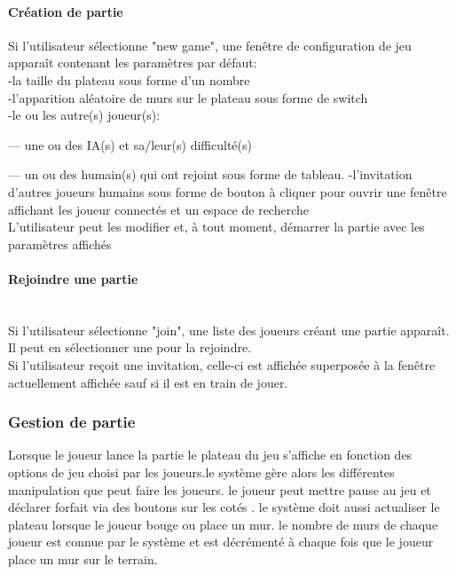 \documentclass[french, utf8]{article}
\begin{document}
\paragraph{Création de partie}
\label{sec:CréationDePartie}
Si l’utilisateur sélectionne
"new game",
une fenêtre de configuration de jeu apparaît contenant les paramètres par défaut: \\
    -la taille du plateau sous forme d'un nombre\\
    -l'apparition aléatoire de murs sur le plateau sous forme de switch\\
    -le ou les autre(s) joueur(s):
\item---  une ou des IA(s) et sa/leur(s) difficulté(s)
\item---  un ou des humain(s) qui ont rejoint sous forme de tableau.
    -l'invitation d'autres joueurs humains sous forme de bouton à cliquer pour ouvrir une fenêtre affichant les joueur connectés et un espace de recherche
\\L'utilisateur peut les modifier et, à tout moment, démarrer la partie avec les paramètres
affichés

\paragraph{Rejoindre une partie}
\\Si l’utilisateur sélectionne
"join", une liste des joueurs créant une partie apparaît.
\\Il peut en sélectionner une pour la rejoindre.
\\Si l’utilisateur reçoit une invitation, celle-ci est affichée superposée à la fenêtre actuellement affichée sauf si il est en train de jouer.

\subsubsection{Gestion de partie}
\label{sec:GestionDePartie}
Lorsque le joueur lance la partie le plateau du jeu s'affiche en fonction des options de jeu choisi par les joueurs.le système gère alors les différentes manipulation que peut faire les joueurs. le joueur peut mettre pause au jeu et déclarer forfait via des boutons sur les cotés  . le système doit aussi actualiser le plateau lorsque le joueur bouge ou place un mur. le nombre de murs de chaque joueur est connue par le système et est décrémenté à chaque fois que le joueur place un mur sur le terrain.
\end{document}
